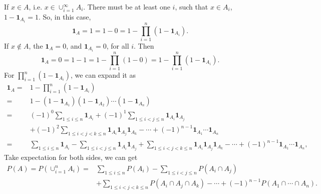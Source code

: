 \documentclass[en, normal, 11pt, black]{elegantnote}
\renewenvironment{proof}{\begin{tcolorbox}[colback=white, colframe=black!50, breakable, title=Proof. ]\setlength{\parskip}{0.8em}}{\\\rightline{$\square$}\end{tcolorbox}}
\begin{document}
    \begin{proof}
        If $x\in A$, i.e. $x\in \cup_{i=1}^\infty A_i$. There must be at least one $i$, such that $x\in A_i$, $1-\mathbf{1}_{A_i}=1$. So, in this case, 
        \[
            \mathbf{1}_A=1=1-0=1-\prod_{i=1}^n(1-\mathbf{1}_{A_i}). 
        \] 
        If $x\not\in A$, the $\mathbf{1}_A=0$, and $\mathbf{1}_{A_i}=0$, for all $i$. Then
        \[
            \mathbf{1}_{A}=0=1-1=1-\prod_{i=1}^n(1-0)=1-\prod_{i=1}^n(1-\mathbf{1}_{A_i}). 
        \]
        For $\prod_{i=1}^n(1-\mathbf{1}_{A_i})$, we can expand it as
        \begin{align*}
            \mathbf{1}_A=&1-\prod_{i=1}^n(1-\mathbf{1}_{A_i})\\
            =&1-(1-\mathbf{1}_{A_1})(1-\mathbf{1}_{A_2})\cdots(1-\mathbf{1}_{A_n})\\
            =&(-1)^{0}\sum_{1\leqslant i\leqslant n}\mathbf{1}_{A_i}+(-1)^{1}\sum_{1\leqslant i<j\leqslant n}\mathbf{1}_{A_i}\mathbf{1}_{A_j}\\
            &+(-1)^{2}\sum_{1\leqslant i<j<k\leqslant n}\mathbf{1}_{A_i}\mathbf{1}_{A_j}\mathbf{1}_{A_k}-\cdots+(-1)^{n-1}\mathbf{1}_{A_1}\cdots\mathbf{1}_{A_n}\\
            =&\sum_{1\leqslant i\leqslant n}\mathbf{1}_{A_i}-\sum_{1\leqslant i<j\leqslant n}\mathbf{1}_{A_i}\mathbf{1}_{A_j}
            +\sum_{1\leqslant i<j<k\leqslant n}\mathbf{1}_{A_i}\mathbf{1}_{A_j}\mathbf{1}_{A_k}-\cdots+(-1)^{n-1}\mathbf{1}_{A_1}\cdots\mathbf{1}_{A_n}, 
        \end{align*}
        Take expectation for both sides, we can get
        \begin{align*}
            P(A)=P(\cup_{i=1}^nA_i)=&\sum_{1\leqslant i\leqslant n}P(A_i)-\sum_{1\leqslant i<j\leqslant n}P(A_i\cap A_j)\\
            &+\sum_{1\leqslant i<j<k\leqslant n}P(A_i\cap A_j\cap A_k)-\cdots+(-1)^{n-1}P(A_1\cap\cdots\cap A_n). 
        \end{align*}
        \vspace{-30pt}
    \end{proof}

\end{document}
